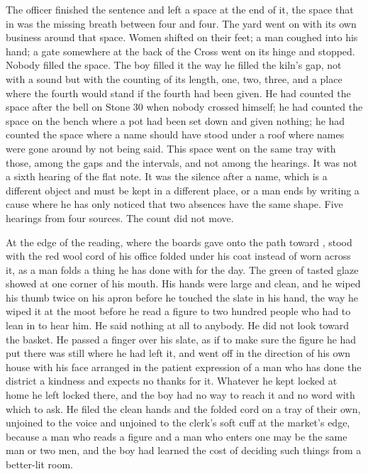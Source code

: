 The officer finished the sentence and left a space at the end of it, the space that in  was the missing breath between four and four. The yard went on with its own business around that space. Women shifted on their feet; a man coughed into his hand; a gate somewhere at the back of the Cross went on its hinge and stopped. Nobody filled the space. The boy filled it the way he filled the kiln's gap, not with a sound but with the counting of its length, one, two, three, and a place where the fourth would stand if the fourth had been given. He had counted the space after the bell on Stone 30 when nobody crossed himself; he had counted the space on the bench where a pot had been set down and given nothing; he had counted the space where a name should have stood under a roof where names were gone around by not being said. This space went on the same tray with those, among the gaps and the intervals, and not among the hearings. It was not a sixth hearing of the flat note. It was the silence after a name, which is a different object and must be kept in a different place, or a man ends by writing a cause where he has only noticed that two absences have the same shape. Five hearings from four sources. The count did not move.

At the edge of the reading, where the boards gave onto the path toward ,  stood with the red wool cord of his office folded under his coat instead of worn across it, as a man folds a thing he has done with for the day. The green of tasted glaze showed at one corner of his mouth. His hands were large and clean, and he wiped his thumb twice on his apron before he touched the slate in his hand, the way he wiped it at the moot before he read a figure to two hundred people who had to lean in to hear him. He said nothing at all to anybody. He did not look toward the basket. He passed a finger over his slate, as if to make sure the figure he had put there was still where he had left it, and went off in the direction of his own house with his face arranged in the patient expression of a man who has done the district a kindness and expects no thanks for it. Whatever he kept locked at home he left locked there, and the boy had no way to reach it and no word with which to ask. He filed the clean hands and the folded cord on a tray of their own, unjoined to the voice and unjoined to the clerk's soft cuff at the market's edge, because a man who reads a figure and a man who enters one may be the same man or two men, and the boy had learned the cost of deciding such things from a better-lit room.

